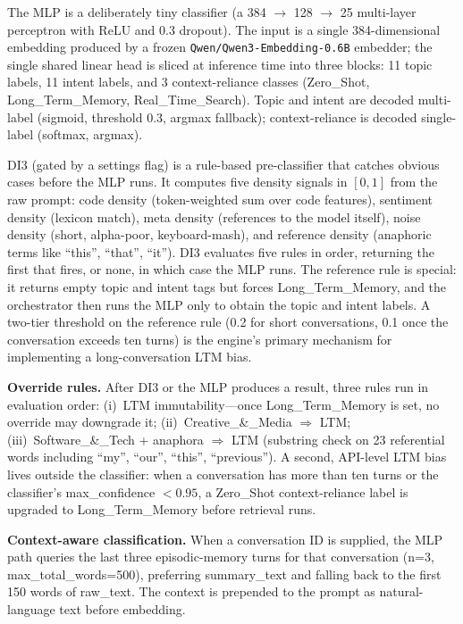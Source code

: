 \documentclass[10pt]{article}
\begin{document}
The MLP is a deliberately tiny classifier (a 384 $\rightarrow$ 128 $\rightarrow$ 25 multi-layer perceptron with ReLU and 0.3 dropout). The input is a single 384-dimensional embedding produced by a frozen \texttt{Qwen/Qwen3-Embedding-0.6B} embedder; the single shared linear head is sliced at inference time into three blocks: 11 topic labels, 11 intent labels, and 3 context-reliance classes (Zero\_Shot, Long\_Term\_Memory, Real\_Time\_Search). Topic and intent are decoded multi-label (sigmoid, threshold 0.3, argmax fallback); context-reliance is decoded single-label (softmax, argmax).

DI3 (gated by a settings flag) is a rule-based pre-classifier that catches obvious cases before the MLP runs. It computes five density signals in $[0,1]$ from the raw prompt: code density (token-weighted sum over code features), sentiment density (lexicon match), meta density (references to the model itself), noise density (short, alpha-poor, keyboard-mash), and reference density (anaphoric terms like ``this'', ``that'', ``it''). DI3 evaluates five rules in order, returning the first that fires, or none, in which case the MLP runs. The reference rule is special: it returns empty topic and intent tags but forces Long\_Term\_Memory, and the orchestrator then runs the MLP only to obtain the topic and intent labels. A two-tier threshold on the reference rule (0.2 for short conversations, 0.1 once the conversation exceeds ten turns) is the engine's primary mechanism for implementing a long-conversation LTM bias.

\textbf{Override rules.} After DI3 or the MLP produces a result, three rules run in evaluation order: (i)~LTM immutability---once Long\_Term\_Memory is set, no override may downgrade it; (ii)~Creative\_\&\_Media $\Rightarrow$ LTM; (iii)~Software\_\&\_Tech + anaphora $\Rightarrow$ LTM (substring check on 23 referential words including ``my'', ``our'', ``this'', ``previous''). A second, API-level LTM bias lives outside the classifier: when a conversation has more than ten turns or the classifier's max\_confidence $< 0.95$, a Zero\_Shot context-reliance label is upgraded to Long\_Term\_Memory before retrieval runs.

\textbf{Context-aware classification.} When a conversation ID is supplied, the MLP path queries the last three episodic-memory turns for that conversation (n=3, max\_total\_words=500), preferring summary\_text and falling back to the first 150 words of raw\_text. The context is prepended to the prompt as natural-language text before embedding.
\end{document}
